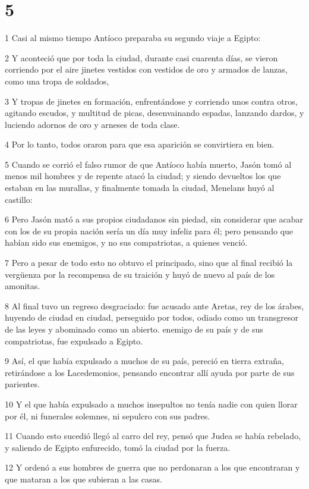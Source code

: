 \chapter{5}

\par 1 Casi al mismo tiempo Antíoco preparaba su segundo viaje a Egipto:
\par 2 Y aconteció que por toda la ciudad, durante casi cuarenta días, se vieron corriendo por el aire jinetes vestidos con vestidos de oro y armados de lanzas, como una tropa de soldados,
\par 3 Y tropas de jinetes en formación, enfrentándose y corriendo unos contra otros, agitando escudos, y multitud de picas, desenvainando espadas, lanzando dardos, y luciendo adornos de oro y arneses de toda clase.
\par 4 Por lo tanto, todos oraron para que esa aparición se convirtiera en bien.
\par 5 Cuando se corrió el falso rumor de que Antíoco había muerto, Jasón tomó al menos mil hombres y de repente atacó la ciudad; y siendo devueltos los que estaban en las murallas, y finalmente tomada la ciudad, Menelans huyó al castillo:
\par 6 Pero Jasón mató a sus propios ciudadanos sin piedad, sin considerar que acabar con los de su propia nación sería un día muy infeliz para él; pero pensando que habían sido sus enemigos, y no sus compatriotas, a quienes venció.
\par 7 Pero a pesar de todo esto no obtuvo el principado, sino que al final recibió la vergüenza por la recompensa de su traición y huyó de nuevo al país de los amonitas.
\par 8 Al final tuvo un regreso desgraciado: fue acusado ante Aretas, rey de los árabes, huyendo de ciudad en ciudad, perseguido por todos, odiado como un transgresor de las leyes y abominado como un abierto. enemigo de su país y de sus compatriotas, fue expulsado a Egipto.
\par 9 Así, el que había expulsado a muchos de su país, pereció en tierra extraña, retirándose a los Lacedemonios, pensando encontrar allí ayuda por parte de sus parientes.
\par 10 Y el que había expulsado a muchos insepultos no tenía nadie con quien llorar por él, ni funerales solemnes, ni sepulcro con sus padres.
\par 11 Cuando esto sucedió llegó al carro del rey, pensó que Judea se había rebelado, y saliendo de Egipto enfurecido, tomó la ciudad por la fuerza.
\par 12 Y ordenó a sus hombres de guerra que no perdonaran a los que encontraran y que mataran a los que subieran a las casas.
